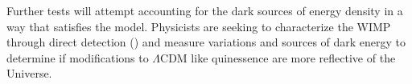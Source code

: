 \documentclass{paper}
\begin{document}
  Further tests will attempt accounting for the dark sources of energy density 
  in a way that satisfies the model. Physicists are seeking to characterize 
  the WIMP through direct detection (\cite{PETER201445}) and measure 
  variations and sources of dark energy to determine if modifications to 
  $\Lambda$CDM like quinessence are more reflective of the Universe.


\pagebreak
\begin{singlespace}
\printbibliography
\end{singlespace}

\end{document}

